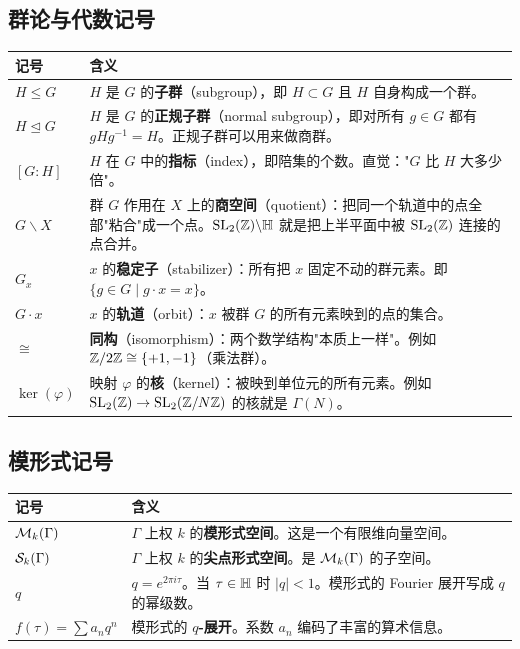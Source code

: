 \subsection*{群论与代数记号}

\begin{longtable}{@{}p{3.5cm}p{10cm}@{}}
\toprule
\textbf{记号} & \textbf{含义} \\
\midrule
$H \leq G$ &
  $H$ 是 $G$ 的\textbf{子群}（subgroup），即 $H \subset G$ 且 $H$ 自身构成一个群。 \\[4pt]
$H \trianglelefteq G$ &
  $H$ 是 $G$ 的\textbf{正规子群}（normal subgroup），即对所有 $g \in G$ 都有 $gHg^{-1} = H$。正规子群可以用来做商群。 \\[4pt]
$[G : H]$ &
  $H$ 在 $G$ 中的\textbf{指标}（index），即陪集的个数。直觉："$G$ 比 $H$ 大多少倍"。 \\[4pt]
$G \backslash X$ &
  群 $G$ 作用在 $X$ 上的\textbf{商空间}（quotient）：把同一个轨道中的点全部"粘合"成一个点。$\mathrm{SL}_2(\mathbb{Z}) \backslash \mathbb{H}$ 就是把上半平面中被 $\mathrm{SL}_2(\mathbb{Z})$ 连接的点合并。 \\[4pt]
$G_x$ &
  $x$ 的\textbf{稳定子}（stabilizer）：所有把 $x$ 固定不动的群元素。即 $\{g \in G \mid g \cdot x = x\}$。 \\[4pt]
$G \cdot x$ &
  $x$ 的\textbf{轨道}（orbit）：$x$ 被群 $G$ 的所有元素映到的点的集合。 \\[4pt]
$\cong$ &
  \textbf{同构}（isomorphism）：两个数学结构"本质上一样"。例如 $\mathbb{Z}/2\mathbb{Z} \cong \{+1, -1\}$（乘法群）。 \\[4pt]
$\ker(\varphi)$ &
  映射 $\varphi$ 的\textbf{核}（kernel）：被映到单位元的所有元素。例如 $\mathrm{SL}_2(\mathbb{Z}) \to \mathrm{SL}_2(\mathbb{Z}/N\mathbb{Z})$ 的核就是 $\Gamma(N)$。 \\
\bottomrule
\end{longtable}

\subsection*{模形式记号}

\begin{longtable}{@{}p{3.5cm}p{10cm}@{}}
\toprule
\textbf{记号} & \textbf{含义} \\
\midrule
$\mathcal{M}_k(\Gamma)$ &
  $\Gamma$ 上权 $k$ 的\textbf{模形式空间}。这是一个有限维向量空间。 \\[4pt]
$\mathcal{S}_k(\Gamma)$ &
  $\Gamma$ 上权 $k$ 的\textbf{尖点形式空间}。是 $\mathcal{M}_k(\Gamma)$ 的子空间。 \\[4pt]
$q$ &
  $q = e^{2\pi i \tau}$。当 $\tau \in \mathbb{H}$ 时 $|q| < 1$。模形式的 Fourier 展开写成 $q$ 的幂级数。 \\[4pt]
$f(\tau) = \sum a_n q^n$ &
  模形式的 \textbf{$q$-展开}。系数 $a_n$ 编码了丰富的算术信息。 \\
\bottomrule
\end{longtable}
